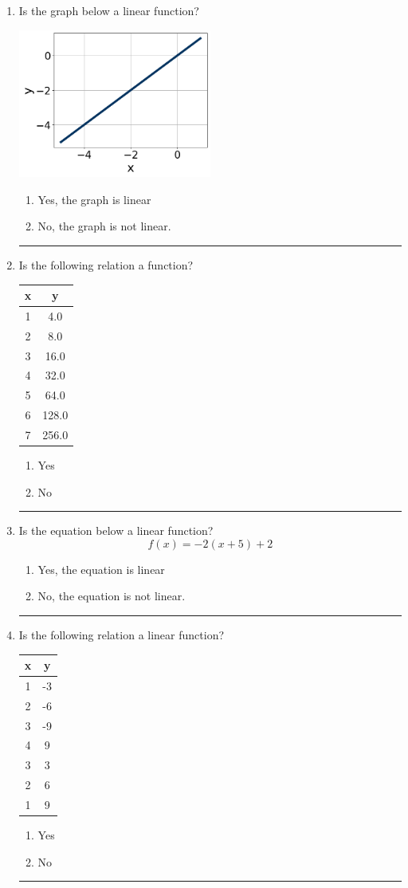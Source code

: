 \documentclass[14pt]{extbook}
\newcommand{\litem}[1]{\item#1\hspace*{-1cm}\rule{\textwidth}{0.4pt}}
\begin{document}
\begin{enumerate}
\litem{
Is the graph below a linear function?
\begin{center}
    \includegraphics[width=0.5\textwidth]{../Figures/MA_8_F_1_2_graphA.png}
\end{center}
\begin{enumerate}[label=\Alph*.]
\item Yes, the graph is linear
\item No, the graph is not linear.

\end{enumerate} }
\litem{
Is the following relation a function?

\begin{tabular}{c|c}
x &y\tabularnewline \hline
1 &4.0\tabularnewline \hline
2 &8.0\tabularnewline \hline
3 &16.0\tabularnewline \hline
4 &32.0\tabularnewline \hline
5 &64.0\tabularnewline \hline
6 &128.0\tabularnewline \hline
7 &256.0\end{tabular}\begin{enumerate}[label=\Alph*.]
\item Yes
\item No

\end{enumerate} }
\litem{
Is the equation below a linear function?\[ f(x) = -2(x + 5)+2 \]\begin{enumerate}[label=\Alph*.]
\item Yes, the equation is linear
\item No, the equation is not linear.

\end{enumerate} }
\litem{
Is the following relation a linear function?

\begin{tabular}{c|c}
x &y\tabularnewline \hline
1 &-3\tabularnewline \hline
2 &-6\tabularnewline \hline
3 &-9\tabularnewline \hline
4 &9\tabularnewline \hline
3 &3\tabularnewline \hline
2 &6\tabularnewline \hline
1 &9\end{tabular}\begin{enumerate}[label=\Alph*.]
\item Yes
\item No


\end{enumerate}}
\end{enumerate}
\end{document}
